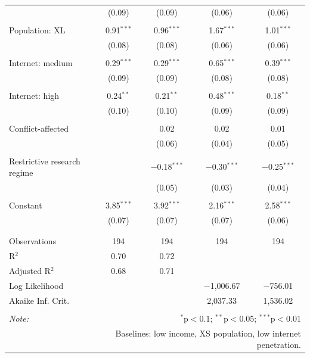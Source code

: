 \begin{table}[!htbp]
\begin{tabular}{@{\extracolsep{5pt}}lcccc}
  & (0.09) & (0.09) & (0.06) & (0.06) \\ 
  & & & & \\ 
 Population: XL & 0.91$^{***}$ & 0.96$^{***}$ & 1.67$^{***}$ & 1.01$^{***}$ \\ 
  & (0.08) & (0.08) & (0.06) & (0.06) \\ 
  & & & & \\ 
 Internet: medium & 0.29$^{***}$ & 0.29$^{***}$ & 0.65$^{***}$ & 0.39$^{***}$ \\ 
  & (0.09) & (0.09) & (0.08) & (0.08) \\ 
  & & & & \\ 
 Internet: high & 0.24$^{**}$ & 0.21$^{**}$ & 0.48$^{***}$ & 0.18$^{**}$ \\ 
  & (0.10) & (0.10) & (0.09) & (0.09) \\ 
  & & & & \\ 
 Conflict-affected &  & 0.02 & 0.02 & 0.01 \\ 
  &  & (0.06) & (0.04) & (0.05) \\ 
  & & & & \\ 
 Restrictive research regime &  & $-$0.18$^{***}$ & $-$0.30$^{***}$ & $-$0.25$^{***}$ \\ 
  &  & (0.05) & (0.03) & (0.04) \\ 
  & & & & \\ 
 Constant & 3.85$^{***}$ & 3.92$^{***}$ & 2.16$^{***}$ & 2.58$^{***}$ \\ 
  & (0.07) & (0.07) & (0.07) & (0.06) \\ 
  & & & & \\ 
\hline \\[-1.8ex] 
Observations & 194 & 194 & 194 & 194 \\ 
R$^{2}$ & 0.70 & 0.72 &  &  \\ 
Adjusted R$^{2}$ & 0.68 & 0.71 &  &  \\ 
Log Likelihood &  &  & $-$1,006.67 & $-$756.01 \\ 
Akaike Inf. Crit. &  &  & 2,037.33 & 1,536.02 \\ 
\hline 
\hline \\[-1.8ex] 
\textit{Note:}  & \multicolumn{4}{r}{$^{*}$p$<$0.1; $^{**}$p$<$0.05; $^{***}$p$<$0.01} \\ 
 & \multicolumn{4}{r}{Baselines: low income, XS population, low internet penetration.} \\ 
\end{tabular} 
\end{table} 
